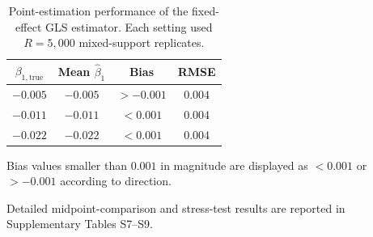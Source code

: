 \documentclass[journal=rsm]{CUP-JNL-DTM}%
\theoremstyle{definition}
\numberwithin{equation}{section}
\begin{document}
\begin{table}[htbp]
\centering
\caption{Point-estimation performance of the fixed-effect GLS estimator. Each setting used $R=5{,}000$ mixed-support replicates.}
\label{tab:simfixed}
\begin{tabular}{cccc}
\toprule
$\beta_{1,\mathrm{true}}$ & Mean $\hat\beta_1$ & Bias & RMSE \\
\midrule
$-0.005$ & $-0.005$ & $>-0.001$ & $0.004$ \\
$-0.011$ & $-0.011$ & $<0.001$ & $0.004$ \\
$-0.022$ & $-0.022$ & $<0.001$ & $0.004$ \\
\bottomrule
\end{tabular}

\vspace{2pt}
{\footnotesize Bias values smaller than $0.001$ in magnitude are displayed as
$<0.001$ or $>-0.001$ according to direction.}
\end{table}


\noindent Detailed midpoint-comparison and stress-test results are reported in
Supplementary Tables S7--S9.

\FloatBarrier



\end{document}
